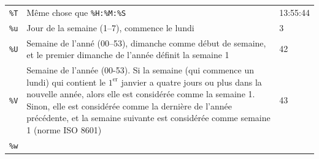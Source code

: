 \documentclass[
  11pt,
]{book}
\numberwithin{equation}{section}
\numberwithin{countremarque}{section}
\begin{document}
\begin{longtable}[]{@{}lll@{}}
\begin{minipage}[t]{0.20\columnwidth}
\texttt{\%T}\strut
\end{minipage} & \begin{minipage}[t]{0.42\columnwidth}\raggedright
Même chose que \texttt{\%H:\%M:\%S}\strut
\end{minipage} & \begin{minipage}[t]{0.29\columnwidth}\raggedright
13:55:44\strut
\end{minipage}\tabularnewline
\begin{minipage}[t]{0.20\columnwidth}\raggedright
\texttt{\%u}\strut
\end{minipage} & \begin{minipage}[t]{0.42\columnwidth}\raggedright
Jour de la semaine (1--7), commence le lundi\strut
\end{minipage} & \begin{minipage}[t]{0.29\columnwidth}\raggedright
3\strut
\end{minipage}\tabularnewline
\begin{minipage}[t]{0.20\columnwidth}\raggedright
\texttt{\%U}\strut
\end{minipage} & \begin{minipage}[t]{0.42\columnwidth}\raggedright
Semaine de l'anné (00--53), dimanche comme début de semaine, et le premier dimanche de l'année définit la semaine 1\strut
\end{minipage} & \begin{minipage}[t]{0.29\columnwidth}\raggedright
42\strut
\end{minipage}\tabularnewline
\begin{minipage}[t]{0.20\columnwidth}\raggedright
\texttt{\%V}\strut
\end{minipage} & \begin{minipage}[t]{0.42\columnwidth}\raggedright
Semaine de l'année (00-53). Si la semaine (qui commence un lundi) qui contient le \(1^\textrm{er}\) janvier a quatre jours ou plus dans la nouvelle année, alors elle est considérée comme la semaine 1. Sinon, elle est considérée comme la dernière de l'année précédente, et la semaine suivante est considérée comme semaine 1 (norme ISO 8601)\strut
\end{minipage} & \begin{minipage}[t]{0.29\columnwidth}\raggedright
43\strut
\end{minipage}\tabularnewline
\begin{minipage}[t]{0.20\columnwidth}\raggedright
\texttt{\%w}\strut
\end{minipage} & \begin{minipage}[t]{0.42\columnwidth}\raggedright

\end{minipage}
\end{longtable}
\end{document}
